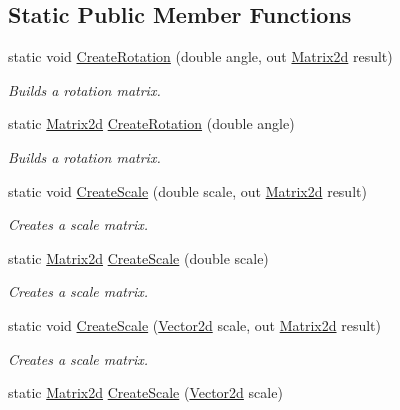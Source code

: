 \subsection*{Static Public Member Functions}
\begin{DoxyCompactItemize}
\item 
static void \hyperlink{struct_open_t_k_1_1_matrix2d_a60d9c8e27b32aa161f48dc175ceaae76}{Create\-Rotation} (double angle, out \hyperlink{struct_open_t_k_1_1_matrix2d}{Matrix2d} result)
\begin{DoxyCompactList}\small\item\em Builds a rotation matrix. \end{DoxyCompactList}\item 
static \hyperlink{struct_open_t_k_1_1_matrix2d}{Matrix2d} \hyperlink{struct_open_t_k_1_1_matrix2d_a7e870a42853f9c40059f122983459386}{Create\-Rotation} (double angle)
\begin{DoxyCompactList}\small\item\em Builds a rotation matrix. \end{DoxyCompactList}\item 
static void \hyperlink{struct_open_t_k_1_1_matrix2d_a7feb9547d2b10799fbc3490a111e68ab}{Create\-Scale} (double scale, out \hyperlink{struct_open_t_k_1_1_matrix2d}{Matrix2d} result)
\begin{DoxyCompactList}\small\item\em Creates a scale matrix. \end{DoxyCompactList}\item 
static \hyperlink{struct_open_t_k_1_1_matrix2d}{Matrix2d} \hyperlink{struct_open_t_k_1_1_matrix2d_a804dc89510552d2887e9e9ded0815a85}{Create\-Scale} (double scale)
\begin{DoxyCompactList}\small\item\em Creates a scale matrix. \end{DoxyCompactList}\item 
static void \hyperlink{struct_open_t_k_1_1_matrix2d_a1c6cf2de105a002f0689ea525599e6c5}{Create\-Scale} (\hyperlink{struct_open_t_k_1_1_vector2d}{Vector2d} scale, out \hyperlink{struct_open_t_k_1_1_matrix2d}{Matrix2d} result)
\begin{DoxyCompactList}\small\item\em Creates a scale matrix. \end{DoxyCompactList}\item 
static \hyperlink{struct_open_t_k_1_1_matrix2d}{Matrix2d} \hyperlink{struct_open_t_k_1_1_matrix2d_af2eda2f77cd58dad0ab273a8013167f8}{Create\-Scale} (\hyperlink{struct_open_t_k_1_1_vector2d}{Vector2d} scale)

\end{DoxyCompactItemize}
